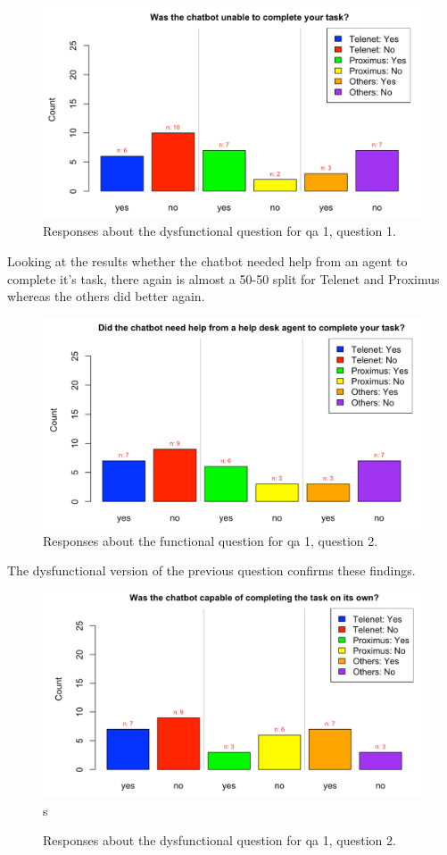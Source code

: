 \begin{figure}[!htb]
	\includegraphics[width=\linewidth, scale=0.5]{../LaTeX/Figures/Comparative/DQ1.png}
	\caption{Responses about the dysfunctional question for \acrshort{qa} 1, question 1.}\label{fig:DQ1}
\end{figure}
\break
Looking at the results whether the chatbot needed help from an agent to complete it's task, there again is almost a 50-50 split for Telenet and Proximus whereas the others did better again.\\
\begin{figure}[!htb]
	\includegraphics[width=\linewidth, scale=0.5]{../LaTeX/Figures/Comparative/Q1b.png}
	\caption{Responses about the functional question for \acrshort{qa} 1, question 2.}\label{fig:Q1b}
\end{figure}
The dysfunctional version of the previous question confirms these findings.\\
\begin{figure}[!htb]
	\includegraphics[width=\linewidth, scale=0.5]{../LaTeX/Figures/Comparative/DQ1b.png}s
	\caption{Responses about the dysfunctional question for \acrshort{qa} 1, question 2.}\label{fig:DQ1b}
\end{figure}
